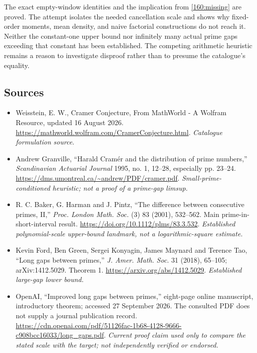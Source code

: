 \documentclass[11pt,a4paper]{article}
\numberwithin{equation}{section}
\begin{document}
The exact empty-window identities and the implication from
\eqref{160:missing} are proved. The attempt isolates the needed
cancellation scale and shows why fixed-order moments, mean density, and
naive factorial constructions do not reach it. Neither the constant-one
upper bound nor infinitely many actual prime gaps exceeding that constant
has been established. The competing arithmetic heuristic remains a reason
to investigate disproof rather than to presume the catalogue's equality.

\subsection{Sources}
\begin{itemize}\raggedright
\item[\textnormal{[S1]}]\hypertarget{source:160:1}{} Weisstein, E. W., Cramer Conjecture, From MathWorld - A Wolfram Resource, updated 16 August 2026.
\url{https://mathworld.wolfram.com/CramerConjecture.html}.
{\small\textit{Catalogue formulation source.}}
\item[\textnormal{[E1]}]\hypertarget{extra:160:1}{} Andrew Granville, ``Harald Cram\'er and the distribution of prime numbers,'' \emph{Scandinavian Actuarial Journal} 1995, no. 1, 12--28, especially pp. 23--24.
\url{https://dms.umontreal.ca/~andrew/PDF/cramer.pdf}.
{\small\textit{Small-prime-conditioned heuristic; not a proof of a prime-gap limsup.}}
\item[\textnormal{[E2]}]\hypertarget{extra:160:2}{} R. C. Baker, G. Harman and J. Pintz, ``The difference between consecutive primes, II,'' \emph{Proc. London Math. Soc.} (3) 83 (2001), 532--562. Main prime-in-short-interval result.
\url{https://doi.org/10.1112/plms/83.3.532}.
{\small\textit{Established polynomial-scale upper-bound landmark, not a logarithmic-square estimate.}}
\item[\textnormal{[E3]}]\hypertarget{extra:160:3}{} Kevin Ford, Ben Green, Sergei Konyagin, James Maynard and Terence Tao, ``Long gaps between primes,'' \emph{J. Amer. Math. Soc.} 31 (2018), 65--105; arXiv:1412.5029. Theorem 1.
\url{https://arxiv.org/abs/1412.5029}.
{\small\textit{Established large-gap lower bound.}}
\item[\textnormal{[E4]}]\hypertarget{extra:160:4}{} OpenAI, ``Improved long gaps between primes,'' eight-page online manuscript, introductory theorem; accessed 27 September 2026. The consulted PDF does not supply a journal publication record.
\url{https://cdn.openai.com/pdf/51126fac-1b68-4128-9666-c908bcc16033/long_gaps.pdf}.
{\small\textit{Current proof claim used only to compare the stated scale with the target; not independently verified or endorsed.}}
\end{itemize}
\end{document}
